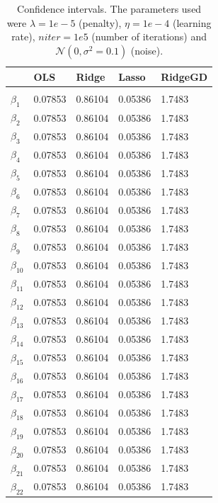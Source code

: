 \begin{table} [H]
	\caption{Confidence intervals. The parameters used were $\lambda=1e-5$ (penalty), $\eta=1e-4$ (learning rate), $niter=1e5$ (number of iterations) and $\mathcal{N}(0, \sigma^2=0.1)$ (noise).  \vspace{2mm}}
	\begin{tabularx}{\textwidth}{l|XXXX} \hline\hline
		\label{tab:CI_terrain}
		&\textbf{OLS}&\textbf{Ridge}&\textbf{Lasso}&\textbf{RidgeGD}\\ \hline \\
		$\beta_1$ & 0.07853 & 0.86104 & 0.05386 & 1.7483\\
		$\beta_2$ & 0.07853 & 0.86104 & 0.05386 & 1.7483\\
		$\beta_3$ & 0.07853 & 0.86104 & 0.05386 & 1.7483\\
		$\beta_4$ & 0.07853 & 0.86104 & 0.05386 & 1.7483\\
		$\beta_5$ & 0.07853 & 0.86104 & 0.05386 & 1.7483\\
		$\beta_6$ & 0.07853 & 0.86104 & 0.05386 & 1.7483\\
		$\beta_7$ & 0.07853 & 0.86104 & 0.05386 & 1.7483\\
		$\beta_8$ & 0.07853 & 0.86104 & 0.05386 & 1.7483\\
		$\beta_9$ & 0.07853 & 0.86104 & 0.05386 & 1.7483\\
		$\beta_{10}$ & 0.07853 & 0.86104 & 0.05386 & 1.7483\\
		$\beta_{11}$ & 0.07853 & 0.86104 & 0.05386 & 1.7483\\
		$\beta_{12}$ & 0.07853 & 0.86104 & 0.05386 & 1.7483\\
		$\beta_{13}$ & 0.07853 & 0.86104 & 0.05386 & 1.7483\\
		$\beta_{14}$ & 0.07853 & 0.86104 & 0.05386 & 1.7483\\
		$\beta_{15}$ & 0.07853 & 0.86104 & 0.05386 & 1.7483\\
		$\beta_{16}$ & 0.07853 & 0.86104 & 0.05386 & 1.7483\\
		$\beta_{17}$ & 0.07853 & 0.86104 & 0.05386 & 1.7483\\
		$\beta_{18}$ & 0.07853 & 0.86104 & 0.05386 & 1.7483\\
		$\beta_{19}$ & 0.07853 & 0.86104 & 0.05386 & 1.7483\\
		$\beta_{20}$ & 0.07853 & 0.86104 & 0.05386 & 1.7483\\
		$\beta_{21}$ & 0.07853 & 0.86104 & 0.05386 & 1.7483\\
		$\beta_{22}$ & 0.07853 & 0.86104 & 0.05386 & 1.7483\\

\end{tabularx}
\end{table}
